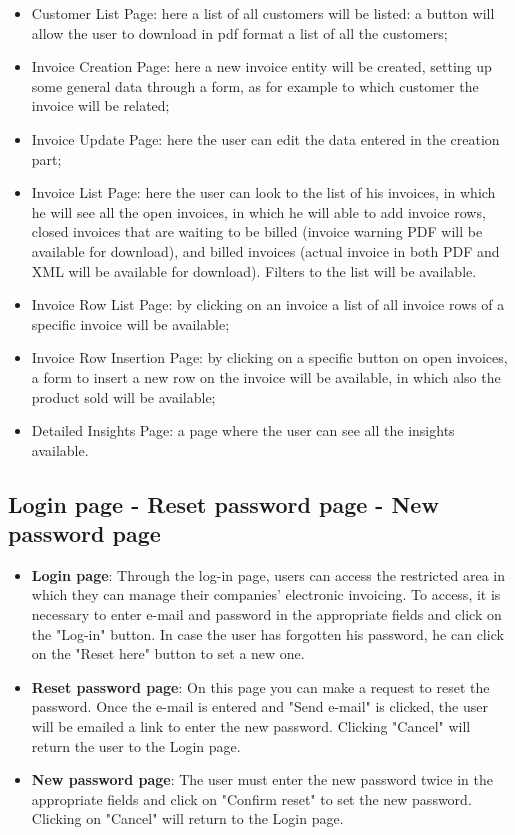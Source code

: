 \begin{itemize}
    \item Customer List Page: here a list of all customers will be listed: a button will allow the user to download in pdf format a list of all the customers;
    \item Invoice Creation Page: here a new invoice entity will be created, setting up some general data through a form, as for example to which customer the invoice will be related;
    \item Invoice Update Page: here the user can edit the data entered in the creation part;
    \item Invoice List Page: here the user can look to the list of his invoices, in which he will see all the open invoices, in which he will able to add invoice rows, closed invoices that are waiting to be billed (invoice warning PDF will be available for download), and billed invoices (actual invoice in both PDF and XML will be available for download). Filters to the list will be available.
    \item Invoice Row List Page: by clicking on an invoice a list of all invoice rows of a specific invoice will be available;
    \item Invoice Row Insertion Page: by clicking on a specific button on open invoices, a form to insert a new row on the invoice will be available, in which also the product sold will be available;
    \item Detailed Insights Page: a page where the user can see all the insights available.
\end{itemize}
\newpage

\subsection{Login page - Reset password page - New password page}

\begin{itemize}
    \item \textbf{Login page}: Through the log-in page, users can access the restricted area in which they can manage their companies' electronic invoicing. To access, it is necessary to enter e-mail and password in the appropriate fields and click on the "Log-in" button.
In case the user has forgotten his password, he can click on the "Reset here" button to set a new one.
    \item \textbf{Reset password page}: On this page you can make a request to reset the password. Once the e-mail is entered and "Send e-mail" is clicked, the user will be emailed a link to enter the new password. Clicking "Cancel" will return the user to the Login page.
    \item \textbf{New password page}: The user must enter the new password twice in the appropriate fields and click on "Confirm reset" to set the new password. Clicking on "Cancel" will return to the Login page.
\end{itemize}

